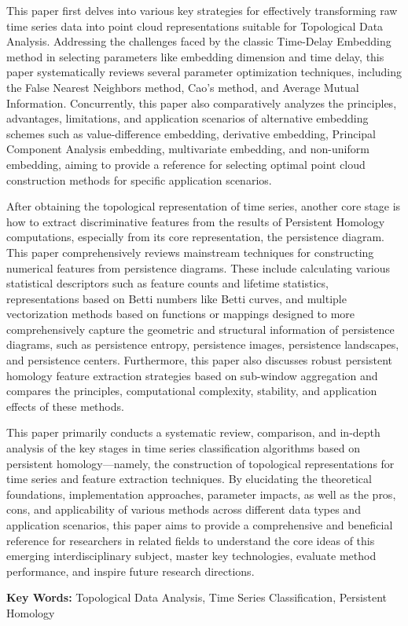 This paper first delves into various key strategies for effectively transforming raw time series data into point cloud representations suitable for Topological Data Analysis. Addressing the challenges faced by the classic Time-Delay Embedding method in selecting parameters like embedding dimension and time delay, this paper systematically reviews several parameter optimization techniques, including the False Nearest Neighbors method, Cao's method, and Average Mutual Information. Concurrently, this paper also comparatively analyzes the principles, advantages, limitations, and application scenarios of alternative embedding schemes such as value-difference embedding, derivative embedding, Principal Component Analysis embedding, multivariate embedding, and non-uniform embedding, aiming to provide a reference for selecting optimal point cloud construction methods for specific application scenarios.

After obtaining the topological representation of time series, another core stage is how to extract discriminative features from the results of Persistent Homology computations, especially from its core representation, the persistence diagram. This paper comprehensively reviews mainstream techniques for constructing numerical features from persistence diagrams. These include calculating various statistical descriptors such as feature counts and lifetime statistics, representations based on Betti numbers like Betti curves, and multiple vectorization methods based on functions or mappings designed to more comprehensively capture the geometric and structural information of persistence diagrams, such as persistence entropy, persistence images, persistence landscapes, and persistence centers. Furthermore, this paper also discusses robust persistent homology feature extraction strategies based on sub-window aggregation and compares the principles, computational complexity, stability, and application effects of these methods.

This paper primarily conducts a systematic review, comparison, and in-depth analysis of the key stages in time series classification algorithms based on persistent homology—namely, the construction of topological representations for time series and feature extraction techniques. By elucidating the theoretical foundations, implementation approaches, parameter impacts, as well as the pros, cons, and applicability of various methods across different data types and application scenarios, this paper aims to provide a comprehensive and beneficial reference for researchers in related fields to understand the core ideas of this emerging interdisciplinary subject, master key technologies, evaluate method performance, and inspire future research directions.

\vskip0.5cm

\textbf{ Key Words:} Topological Data Analysis, Time Series Classification, Persistent Homology




